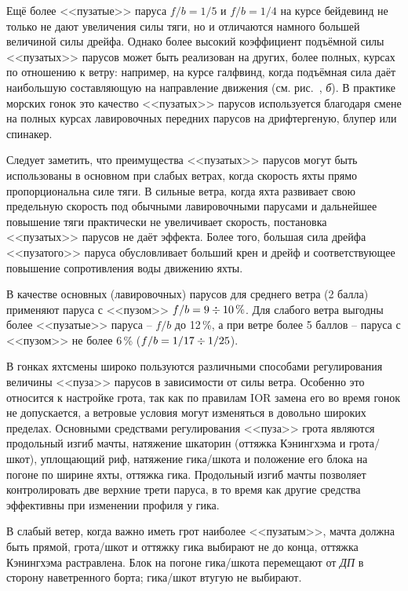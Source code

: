 Ещё более <<пузатые>> паруса $f/b=1/5$ и $f/b=1/4$ на курсе бейдевинд
не только не дают увеличения силы тяги, но и отличаются намного
большей величиной силы дрейфа. Однако более высокий коэффициент
подъёмной силы <<пузатых>> парусов может быть реализован на других,
более полных, курсах по отношению к ветру: например, на курсе
галфвинд, когда подъёмная сила даёт наибольшую составляющую на
направление движения (см. рис.~, \textit{б}). В практике
морских гонок это качество <<пузатых>> парусов используется благодаря
смене на полных курсах лавировочных передних парусов на дрифтергеную,
блупер или спинакер.

Следует заметить, что преимущества <<пузатых>> парусов могут быть
использованы в основном при слабых ветрах, когда скорость яхты прямо
пропорциональна силе тяги. В сильные ветра, когда яхта развивает свою
предельную скорость под обычными лавировочными парусами и дальнейшее
повышение тяги практически не увеличивает скорость, постановка
<<пузатых>> парусов не даёт эффекта. Более того, большая сила дрейфа
<<пузатого>> паруса обусловливает больший крен и дрейф и
соответствующее повышение сопротивления воды движению яхты.

В качестве основных (лавировочных) парусов для среднего ветра (2 балла) применяют паруса с <<пузом>> $f/b=9\div 10\,\%$. Для
слабого ветра выгодны более <<пузатые>> паруса \--- $f/b$ до 12\,\%, а
при ветре более 5 баллов \--- паруса с <<пузом>> не более 6\,\%
($f/b=1/17\div 1/25$).

В гонках яхтсмены широко пользуются различными способами регулирования
величины <<пуза>> парусов в зависимости от силы ветра. Особенно это
относится к настройке грота, так как по правилам IOR замена его во
время гонок не допускается, а ветровые условия могут изменяться в
довольно широких пределах. Основными средствами регулирования <<пуза>>
грота являются продольный изгиб мачты, натяжение шкаторин (оттяжка
Кэнингхэма и грота\-/шкот), уплощающий риф, натяжение гика\-/шкота и
положение его блока на погоне по ширине яхты, оттяжка гика. Продольный
изгиб мачты позволяет контролировать две верхние трети паруса, в то
время как другие средства эффективны при изменении профиля у гика.

В слабый ветер, когда важно иметь грот наиболее <<пузатым>>, мачта
должна быть прямой, грота\-/шкот и оттяжку гика выбирают не до конца,
оттяжка Кэнингхэма растравлена. Блок на погоне гика\-/шкота перемещают
от \textit{ДП} в сторону наветренного борта; гика\-/шкот втугую не
выбирают.

